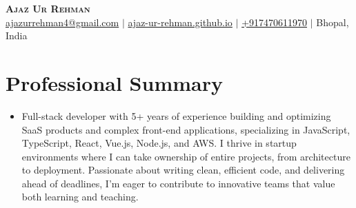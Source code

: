 \documentclass[letterpaper,12pt]{article}
\makeatletter
\newcommand{\resumeItem}[1]{
  \item\small{#1}\vspace{-2pt}
}
\newcommand{\resumeSubHeadingListStart}{\begin{itemize}[leftmargin=0.15in, label={}]}
\newcommand{\resumeSubHeadingListEnd}{\end{itemize}}
\def\myName{Ajaz Ur Rehman}
\def\myHometown{Bhopal, India}
\def\myEmail{ajazurrehman4@gmail.com}
\def\myPhone{+917470611970}
\def\myPortfolioLink{https://ajaz-ur-rehman.github.io}
\makeatother
\begin{document}

\begin{center}
    \textbf{\Huge \scshape \myName} \\ \vspace{3pt}
    \small
    \href{mailto:\myEmail}{ajazurrehman4@gmail.com}
    $|$
    \href{\myPortfolioLink}{ajaz-ur-rehman.github.io}
    $|$
    \href{tel:\myPhone}{\myPhone}
    $|$
    \myHometown\
\end{center}


\section{Professional Summary}
\vspace{3pt}
\resumeSubHeadingListStart

\resumeItem{Full-stack developer with 5+ years of experience building and optimizing SaaS products and complex front-end applications, specializing in JavaScript, TypeScript, React, Vue.js, Node.js, and AWS. I thrive in startup environments where I can take ownership of entire projects, from architecture to deployment. Passionate about writing clean, efficient code, and delivering ahead of deadlines, I'm eager to contribute to innovative teams that value both learning and teaching.}

\resumeSubHeadingListEnd

\end{document}
